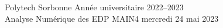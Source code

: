\noindent
Polytech Sorbonne \hfill Ann{\'e}e universitaire 2022--2023\\
Analyse Numérique des EDP \hfill
MAIN4 \hfill mercredi 24 mai 2023